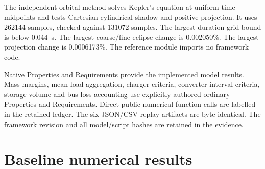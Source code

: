 The independent orbital method solves Kepler's equation at uniform time
midpoints and tests Cartesian cylindrical shadow and positive projection.
It uses 262144 samples, checked against 131072 samples.
The largest duration-grid bound is below 0.044~s.
The largest coarse/fine eclipse change is 0.002050\%.
The largest projection change is 0.0006173\%.
The reference module imports no framework code.

Native Properties and Requirements provide the implemented model results.
Mass margins, mean-load aggregation, charger criteria, converter interval
criteria, storage volume and bus-loss accounting use explicitly authored
ordinary Properties and Requirements.
Direct public numerical function calls are labelled in the retained ledger.
The six JSON/CSV replay artifacts are byte identical.
The framework revision and all model/script hashes are retained in the evidence.

\section{Baseline numerical results}


